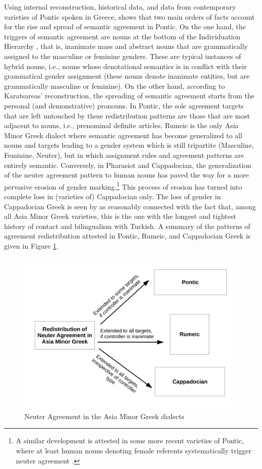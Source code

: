\documentclass[output=collectionpaper]{langsci/langscibook}
\begin{document}
Using internal reconstruction, historical data, and data from contemporary varieties of Pontic spoken in Greece, \citet{Karatsareas2014} shows that two main orders of facts account for the rise and spread of semantic agreement in Pontic. On the one hand, the triggers of semantic agreement are nouns at the bottom of the Individuation Hierarchy \citep{Sasse1993}, that is, inanimate mass and abstract nouns that are grammatically assigned to the masculine or feminine genders. These are typical instances of hybrid nouns, i.e., nouns whose denotational semantics is in conflict with their grammatical gender assignment (these nouns denote inanimate entities, but are grammatically masculine or feminine).  On the other hand, according to Karatsareas' reconstruction, the spreading of semantic agreement starts from the personal (and demonstrative) pronouns. In Pontic, the sole agreement targets that are left untouched by these redistribution patterns are those that are most adjacent to nouns, i.e., prenominal definite articles. Rumeic is the only Asia Minor Greek dialect where semantic agreement has become generalized to all nouns and targets leading to a gender system which is still tripartite (Masculine, Feminine, Neuter), but in which assignment rules and agreement patterns are entirely semantic. Conversely, in Pharasiot and Cappadocian, the generalization of the neuter agreement pattern to human nouns has paved the way for a more pervasive erosion of gender marking.\footnote{A similar development is attested in some more recent varieties of Pontic, where at least human nouns denoting female referents systematically trigger neuter agreement \citep[96--97]{Karatsareas2014}. } This process of erosion has turned into complete loss in (varieties of) Cappadocian only. The loss of gender in Cappadocian Greek is seen by \citet[99]{Karatsareas2014} as reasonably connected with the fact that, among all Asia Minor Greek varieties, this is the one with the longest and tightest history of contact and bilingualism with Turkish. A summary of the patterns of agreement redistribution attested in Pontic, Rumeic, and Cappadocian Greek is given in Figure \ref{fig:dgm:AMG}.

\begin{figure}
\includegraphics[height=.4\textheight]{figures/11/AMG}
\caption{Neuter Agreement in the Asia Minor Greek dialects}
\label{fig:dgm:AMG}
\end{figure}
\end{document}
